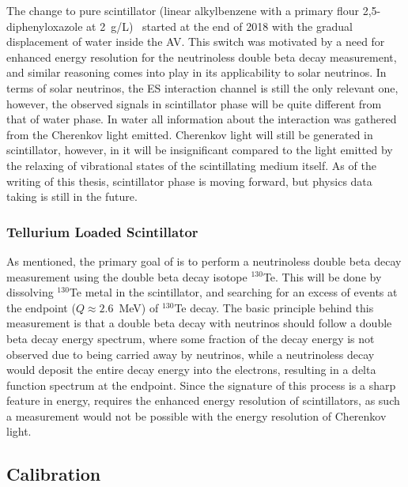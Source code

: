 The change to pure scintillator {\labppo} (linear alkylbenzene with a primary flour 2,5-diphenyloxazole at 2~g/L)~\cite{snop_labppo} started at the end of 2018 with the gradual displacement of water inside the AV.
This switch was motivated by a need for enhanced energy resolution for the neutrinoless double beta decay measurement, and similar reasoning comes into play in its applicability to solar neutrinos.
In terms of solar neutrinos, the ES interaction channel is still the only relevant one, however, the observed signals in scintillator phase will be quite different from that of water phase.
In water all information about the interaction was gathered from the Cherenkov light emitted. 
Cherenkov light will still be generated in scintillator, however, in {\labppo} it will be insignificant compared to the light emitted by the relaxing of vibrational states of the scintillating medium itself.
As of the writing of this thesis, scintillator phase is moving forward, but physics data taking is still in the future.

\subsubsection{Tellurium Loaded Scintillator}
As mentioned, the primary goal of {\snop} is to perform a neutrinoless double beta decay measurement using the double beta decay isotope $^{130}$Te.
This will be done by dissolving $^{130}$Te metal in the {\labppo} scintillator, and searching for an excess of events at the endpoint ($Q \approx 2.6$~MeV) of $^{130}$Te decay.
The basic principle behind this measurement is that a double beta decay with neutrinos should follow a double beta decay energy spectrum, where some fraction of the decay energy is not observed due to being carried away by neutrinos, while a neutrinoless decay would deposit the entire decay energy into the electrons, resulting in a delta function spectrum at the endpoint.
Since the signature of this process is a sharp feature in energy, {\snop} requires the enhanced energy resolution of scintillators, as such a measurement would not be possible with the energy resolution of Cherenkov light.

\subsection{Calibration}

